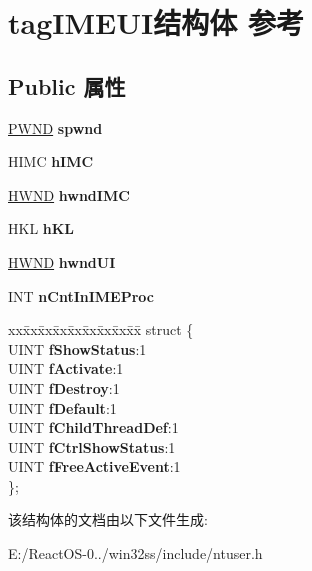 \hypertarget{structtag_i_m_e_u_i}{}\section{tag\+I\+M\+E\+U\+I结构体 参考}
\label{structtag_i_m_e_u_i}
\subsection*{Public 属性}
\begin{DoxyCompactItemize}
\item 
\mbox{\label{structtag_i_m_e_u_i_a4c5d547afa68106533e7d3af4634fa90}} 
\hyperlink{struct___w_n_d}{P\+W\+ND} {\bfseries spwnd}
\item 
\mbox{\label{structtag_i_m_e_u_i_a22fe31c5288413e97d89dfd8126b2a1c}} 
H\+I\+MC {\bfseries h\+I\+MC}
\item 
\mbox{\label{structtag_i_m_e_u_i_a70e3d8cdac46e91c804ce7948b76da36}} 
\hyperlink{interfacevoid}{H\+W\+ND} {\bfseries hwnd\+I\+MC}
\item 
\mbox{\label{structtag_i_m_e_u_i_a1f1e832dd0d04fe8bfb43ba2e0a717ca}} 
H\+KL {\bfseries h\+KL}
\item 
\mbox{\label{structtag_i_m_e_u_i_a7ef4a095ce48c87d5b2c76d3e4993b46}} 
\hyperlink{interfacevoid}{H\+W\+ND} {\bfseries hwnd\+UI}
\item 
\mbox{\label{structtag_i_m_e_u_i_a9725ff88b1a7fd7da656a3133fce51ab}} 
I\+NT {\bfseries n\+Cnt\+In\+I\+M\+E\+Proc}
\item 
\mbox{\label{structtag_i_m_e_u_i_ab062c09245e84cadd115a1b58d90dbd4}} 
\begin{tabbing}
xx\=xx\=xx\=xx\=xx\=xx\=xx\=xx\=xx\=\kill
struct \{\\
\>UINT {\bfseries fShowStatus}:1\\
\>UINT {\bfseries fActivate}:1\\
\>UINT {\bfseries fDestroy}:1\\
\>UINT {\bfseries fDefault}:1\\
\>UINT {\bfseries fChildThreadDef}:1\\
\>UINT {\bfseries fCtrlShowStatus}:1\\
\>UINT {\bfseries fFreeActiveEvent}:1\\
\}; \\

\end{tabbing}\end{DoxyCompactItemize}


该结构体的文档由以下文件生成\+:\begin{DoxyCompactItemize}
\item 
E\+:/\+React\+O\+S-\/0../win32ss/include/ntuser.\+h\end{DoxyCompactItemize}
